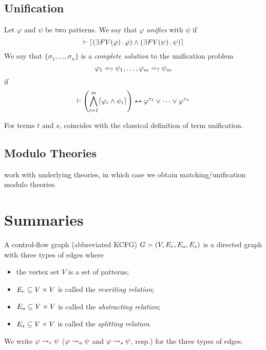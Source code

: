 \documentclass{article}
\begin{document}
\subsection{Unification}

\begin{definition}
\label{def:unification}
Let $\varphi$ and $\psi$ be two patterns. We say that $\varphi$ \emph{unifies}
with $\psi$ if
\[\vdash \lceil\left(\exists \mathit{FV(\varphi)} \,.\, \varphi\right)
  \land \left(\exists \mathit{FV(\psi)} \,.\, \psi\right)\rceil\]
We say that $\{\sigma_1,\dots,\sigma_n\}$ is a \emph{complete solution}
to the unification problem
\[\varphi_1 =_? \psi_1, \dots, \varphi_m =_? \psi_m\]
if
\[\vdash \left(\bigwedge_{i=1}^m \lceil\varphi_i \land \psi_i\rceil\right)
  \leftrightarrow \varphi^{\tau_1} \lor \dots \lor \varphi^{\tau_n}
\]
\end{definition}

\begin{proposition}
For terms $t$ and $s$,
 coincides with the classical definition of term unification.
\end{proposition}

\subsection{Modulo Theories}

 work with underlying theories, 
in which case we obtain matching/unification modulo theories.

\section{\K Summaries}

\begin{definition}
A \K control-flow graph (abbreviated KCFG) $G = (V, E_r, E_a, E_s)$ is a directed graph
with three types of edges where
\begin{itemize}
\item the vertex set $V$ is a set of patterns;
\item $E_r \subseteq V \times V$ is called the \emph{rewriting relation};
\item $E_a \subseteq V \times V$ is called the \emph{abstracting relation};
\item $E_s \subseteq V \times V$ is called the \emph{splitting relation}. 
\end{itemize}
We write $\varphi \rightsquigarrow_r \psi$ 
($\varphi \rightsquigarrow_a \psi$ and $\varphi \rightsquigarrow_s \psi$, resp.)
for the three types of edges.
\end{definition}
\end{document}
